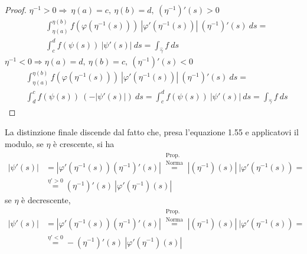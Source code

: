 \begin{proof}
        \indent$\eta^{-1}>0 \Rightarrow \ \eta(a)=c,\  \eta(b)=d,\  (\eta^{-1})'(s)>0$
        \begin{equation}
            \begin{aligned}
                &\int_{\eta(a)}^{\eta(b)}{f(\varphi(\eta^{-1}(s)))\ |\varphi'(\eta^{-1}(s))| \ (\eta^{-1})'(s)\ ds}=\\
                &\int_{c}^{d}{f(\psi(s))\ |\psi'(s)| \ ds}= \int_{\hat{\gamma}}{f \ ds}
            \end{aligned}
        \end{equation}
        \indent$\eta^{-1}<0 \Rightarrow \eta(a)=d, \ \eta(b)=c, \ (\eta^{-1})'(s)<0$
        \begin{equation}
            \begin{aligned}
                &\int_{\eta(a)}^{\eta(b)}{f(\varphi(\eta^{-1}(s)))\ |\varphi'(\eta^{-1}(s))| \ (\eta^{-1})'(s)\ ds}=\\
                &\int_{d}^{c}{f(\psi(s))\ (-|\psi'(s)|)\ ds} = \int_{c}^{d}{f(\psi(s))\ |\psi'(s)|\ ds}= \int_{\hat{\gamma}}{f\ ds}
            \end{aligned}
        \end{equation}
    \end{proof}
    \begin{oss}
        La distinzione finale discende dal fatto che, presa l'equazione 1.55 e applicatovi il modulo, se $\eta$ è crescente, si ha
        \begin{equation}
            \begin{aligned}
                |\psi'(s)|&=|\varphi'(\eta^{-1}(s))(\eta^{-1})'(s)|\overset{\substack{\text{Prop.}\\\text{Norma}}}{=}|(\eta^{-1})(s)|\ |\varphi'(\eta^{-1}(s))=\\
                &\overset{\eta'>0}{=} (\eta^{-1})'(s)\ |\varphi'(\eta^{-1})(s)|
            \end{aligned}
        \end{equation}
        se $\eta$ è decrescente,
        \begin{equation}
            \begin{aligned}
                |\psi'(s)|&=|\varphi'(\eta^{-1}(s))(\eta^{-1})'(s)|\overset{\substack{\text{Prop.}\\\text{Norma}}}{=}|(\eta^{-1})(s)|\ |\varphi'(\eta^{-1}(s))=\\
                &\overset{\eta'<0}{=} -(\eta^{-1})'(s)\ |\varphi'(\eta^{-1})(s)|
            \end{aligned}
        \end{equation}
    \end{oss}
